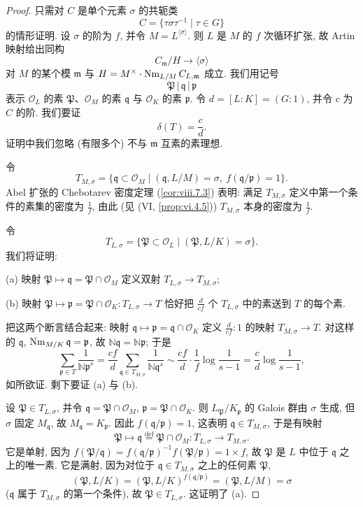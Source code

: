 \begin{proof}
只需对 $C$ 是单个元素 $\sigma$ 的共轭类
\[
C=\{\tau\sigma\tau^{-1}\mid\tau\in G\}
\]
的情形证明. 设 $\sigma$ 的阶为 $f$, 并令 $M=L^{\langle\sigma\rangle}$. 则 $L$ 是 $M$ 的 $f$ 次循环扩张, 故 Artin 映射给出同构
\[
C_{\mathfrak{m}}/H\to\langle\sigma\rangle
\]
对 $M$ 的某个模 $\mathfrak{m}$ 与 $H=M^{\times}\cdot\operatorname{Nm}_{L/M}C_{L,\mathfrak{m}}$ 成立. 我们用记号
\[
\mathfrak{P}\,|\,\mathfrak{q}\,|\,\mathfrak{p}
\]
表示 $\mathcal{O}_L$ 的素 $\mathfrak{P}$、$\mathcal{O}_M$ 的素 $\mathfrak{q}$ 与 $\mathcal{O}_K$ 的素 $\mathfrak{p}$. 令 $d=[L:K]=(G:1)$, 并令 $c$ 为 $C$ 的阶. 我们要证
\[
\delta(T)=\frac{c}{d}.
\]
证明中我们忽略 (有限多个) 不与 $\mathfrak{m}$ 互素的素理想.

令
\[
T_{M,\sigma}=\{\mathfrak{q}\subset\mathcal{O}_{M}\mid(\mathfrak{q},L/M)=\sigma,\ f(\mathfrak{q}/\mathfrak{p})=1\}.
\]
Abel 扩张的 Chebotarev 密度定理 (\ref{cor:viii.7.3}) 表明: 满足 $T_{M,\sigma}$ 定义中第一个条件的素集的密度为 $\frac{1}{f}$, 由此 (见 (VI, \ref{prop:vi.4.5})) $T_{M,\sigma}$ 本身的密度为 $\frac{1}{f}$.

令
\[
T_{L,\sigma}=\{\mathfrak{P}\subset\mathcal{O}_{L}\mid(\mathfrak{P},L/K)=\sigma\}.
\]
我们将证明:

(a) 映射 $\mathfrak{P}\mapsto\mathfrak{q}=\mathfrak{P}\cap\mathcal{O}_M$ 定义双射 $T_{L,\sigma}\to T_{M,\sigma}$;

(b) 映射 $\mathfrak{P}\mapsto\mathfrak{p}=\mathfrak{P}\cap\mathcal{O}_K\colon T_{L,\sigma}\to T$ 恰好把 $\frac{d}{cf}$ 个 $T_{L,\sigma}$ 中的素送到 $T$ 的每个素.

把这两个断言结合起来: 映射 $\mathfrak{q}\mapsto\mathfrak{p}=\mathfrak{q}\cap\mathcal{O}_K$ 定义 $\frac{d}{cf}:1$ 的映射 $T_{M,\sigma}\to T$. 对这样的 $\mathfrak{q}$, $\operatorname{Nm}_{M/K}\mathfrak{q}=\mathfrak{p}$, 故 $\mathbb{N}\mathfrak{q}=\mathbb{N}\mathfrak{p}$; 于是
\[
\sum_{\mathfrak{p}\in T}\frac{1}{\mathbb{N}\mathfrak{p}^{s}}=\frac{cf}{d}\sum_{\mathfrak{q}\in T_{M,\sigma}}\frac{1}{\mathbb{N}\mathfrak{q}^{s}}\sim\frac{cf}{d}\cdot\frac{1}{f}\log\frac{1}{s-1}=\frac{c}{d}\log\frac{1}{s-1},
\]
如所欲证. 剩下要证 (a) 与 (b).

设 $\mathfrak{P}\in T_{L,\sigma}$, 并令 $\mathfrak{q}=\mathfrak{P}\cap\mathcal{O}_M$, $\mathfrak{p}=\mathfrak{P}\cap\mathcal{O}_K$. 则 $L_{\mathfrak{P}}/K_{\mathfrak{p}}$ 的 Galois 群由 $\sigma$ 生成, 但 $\sigma$ 固定 $M_{\mathfrak{q}}$, 故 $M_{\mathfrak{q}}=K_{\mathfrak{p}}$. 因此 $f(\mathfrak{q}/\mathfrak{p})=1$, 这表明 $\mathfrak{q}\in T_{M,\sigma}$, 于是有映射
\[
\mathfrak{P}\mapsto\mathfrak{q}\overset{\text{def}}{=}\mathfrak{P}\cap\mathcal{O}_{M}:T_{L,\sigma}\to T_{M,\sigma}.
\]
它是单射, 因为 $f(\mathfrak{P}/\mathfrak{q})=f(\mathfrak{q}/\mathfrak{p})^{-1}f(\mathfrak{P}/\mathfrak{p})=1\times f$, 故 $\mathfrak{P}$ 是 $L$ 中位于 $\mathfrak{q}$ 之上的唯一素. 它是满射, 因为对位于 $\mathfrak{q}\in T_{M,\sigma}$ 之上的任何素 $\mathfrak{P}$,
\[
(\mathfrak{P},L/K)=(\mathfrak{P},L/K)^{f(\mathfrak{q}/\mathfrak{p})}=(\mathfrak{P},L/M)=\sigma
\]
($\mathfrak{q}$ 属于 $T_{M,\sigma}$ 的第一个条件), 故 $\mathfrak{P}\in T_{L,\sigma}$. 这证明了 (a).


\end{proof}
